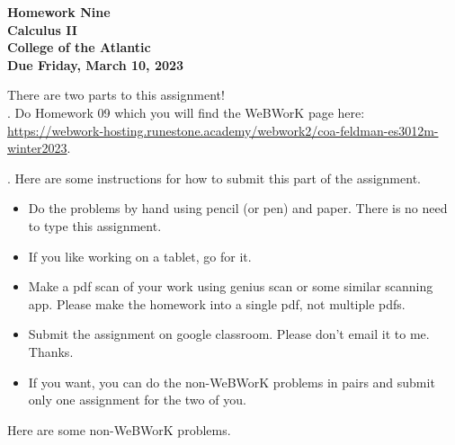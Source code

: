 \documentclass[12pt]{article}
\begin{document}
\pagestyle{empty}
 
\begin{center}
{\LARGE {\bf Homework Nine}}\\
\bigskip
{\Large {\bf Calculus II}}\\
\bigskip
{\Large {\bf College of the Atlantic}}\\
\bigskip
{ {\bf Due Friday, March 10, 2023}}\\ 
\end{center}
\medskip


\noindent There are two parts to this assignment!\\

.  Do Homework 09 which you
will find the WeBWorK page here:
\url{https://webwork-hosting.runestone.academy/webwork2/coa-feldman-es3012m-winter2023}.



.  Here are some
instructions for how to submit this part of the assignment.
\begin{itemize}
\item Do the problems by hand using pencil (or pen) and paper.
  There is no need to type this assignment.
\item If you like working on a tablet, go for it. 
\item Make a pdf scan of your work using genius scan or some
  similar scanning app.  Please make the homework into a single
  pdf, not multiple pdfs.
\item Submit the assignment on google classroom.  Please don't
  email it to me. Thanks.  %
\item If you want, you can do the non-WeBWorK problems in pairs and
  submit only one assignment for the two of you. \\
\end{itemize}

\noindent Here are some non-WeBWorK problems.
\end{document}
